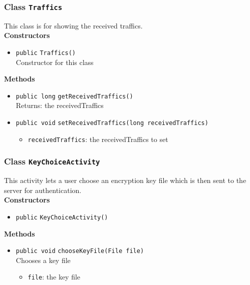\subsubsection{Class \lstinline|Traffics|}
This class is for showing the received traffics. \\




\textbf{Constructors}
\begin{itemize}
\item \lstinline|public| \lstinline|Traffics|\lstinline|()|\\
Constructor for this class



\end{itemize}


\textbf{Methods}
\begin{itemize}
\item \lstinline|public long| \lstinline|getReceivedTraffics|\lstinline|()|\\
Returns: the receivedTraffics



\item \lstinline|public void| \lstinline|setReceivedTraffics|\lstinline|(long receivedTraffics)|

\begin{itemize}
\item \lstinline|receivedTraffics|: the receivedTraffics to set
\end{itemize}



\end{itemize}

\subsubsection{Class \lstinline|KeyChoiceActivity|}
This activity lets a user choose an encryption key file 
 which is then sent to the server for authentication. \\




\textbf{Constructors}
\begin{itemize}
\item \lstinline|public| \lstinline|KeyChoiceActivity|\lstinline|()|




\end{itemize}


\textbf{Methods}
\begin{itemize}
\item \lstinline|public void| \lstinline|chooseKeyFile|\lstinline|(File file)|\\
Chooses a key file
\begin{itemize}
\item \lstinline|file|: the key file
\end{itemize}



\end{itemize}


